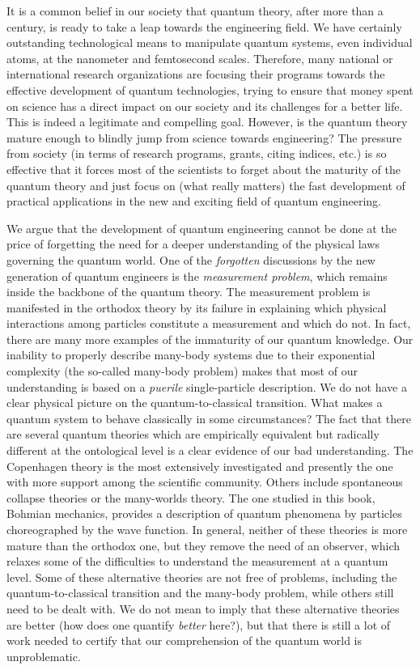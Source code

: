 \documentclass[nofootinbib, secnumarabic, amsmath, nobibnotes,10pt,aps,pra]{revtex4-1}
\begin{document}
It is a common belief in our society that quantum theory, after more than a century, is ready to take a leap towards the engineering field. We have certainly outstanding technological means to manipulate quantum systems, even individual atoms, at the nanometer and femtosecond scales. Therefore, many national or international research organizations are focusing their programs towards the effective development of quantum technologies, trying to ensure that money spent on science has a direct impact on our society and its challenges for a better life. This is indeed a legitimate and compelling goal. However, is the quantum theory mature enough to blindly jump from science towards engineering? The pressure from society (in terms of research programs, grants, citing indices, etc.) is so effective that it forces most of the scientists to forget about the maturity of the quantum theory and just focus on (what really matters) the fast development of practical applications in the new and exciting field of quantum engineering.

We argue that the development of quantum engineering cannot be done at the price of forgetting the need for a deeper understanding of the physical laws governing the quantum world. One of the \emph{forgotten} discussions by the new generation of quantum engineers is the \emph{measurement problem}, which remains inside the backbone of the quantum theory. The measurement problem is manifested in the orthodox theory by its failure in explaining which physical interactions among particles constitute a measurement and which do not. In fact, there are many more examples of the immaturity of our quantum knowledge. Our inability to properly describe many-body systems due to their exponential complexity (the so-called many-body problem) makes that most of our understanding is based on a \emph{puerile} single-particle description. We do not have a clear physical picture on the quantum-to-classical transition. What makes a quantum system to behave classically in some circumstances? The fact that there are several quantum theories which are empirically equivalent but radically different at the ontological level is a clear evidence of our bad understanding. The Copenhagen theory is the most extensively investigated and presently the one with more support among the scientific community. Others include spontaneous collapse theories or the many-worlds theory. The one studied in this book, Bohmian mechanics, provides a description of quantum phenomena by particles choreographed by the wave function. In general, neither of these theories is more mature than the orthodox one, but they remove the need of an observer, which relaxes some of the difficulties to understand the measurement at a quantum level. Some of these alternative theories are not free of problems, including the quantum-to-classical transition and the many-body problem, while others still need to be dealt with. We do not mean to imply that these alternative theories are better (how does one quantify \emph{better} here?), but that there is still a lot of work needed to certify that our comprehension of the quantum world is unproblematic. 
\end{document}
